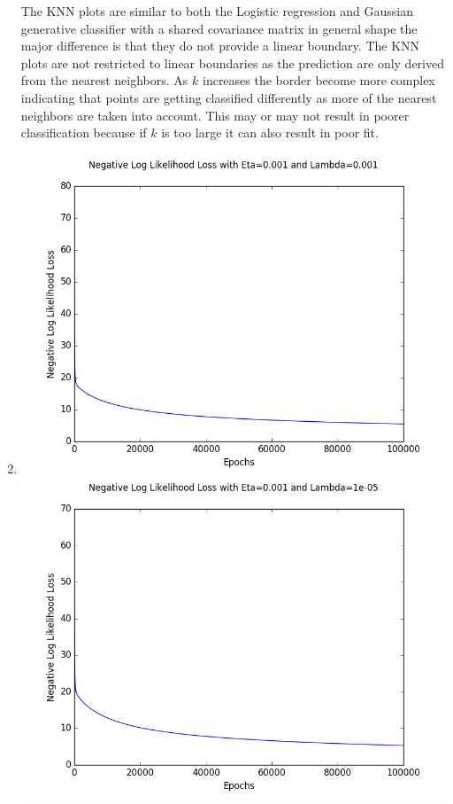 \documentclass[submit]{harvardml}
\begin{document}
\begin{enumerate}
    The KNN plots are similar to both the Logistic regression and Gaussian generative classifier with a shared covariance matrix in general shape the major difference is that they do not provide a linear boundary. The KNN plots are not restricted to linear boundaries as the prediction are only derived from the nearest neighbors. As $k$ increases the border become more complex indicating that points are getting classified differently as more of the nearest neighbors are taken into account. This may or may not result in poorer classification because if $k$ is too large it can also result in poor fit.
    \item \hspace{2cm} \newline
        \includegraphics[scale=.40]{hw2/P3_Pics/eta=0.001=lam.png}
        \includegraphics[scale=.40]{hw2/P3_Pics/eta=0.001lam=.00001.png}

\end{enumerate}
\end{document}
